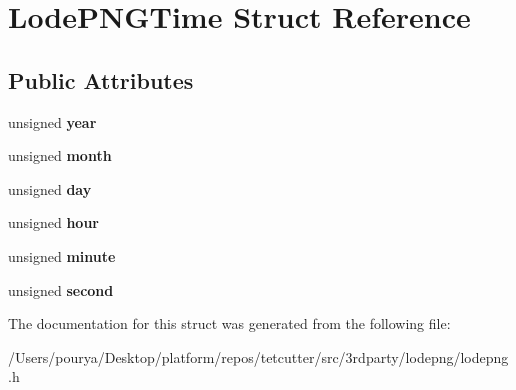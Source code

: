 \hypertarget{structLodePNGTime}{}\section{Lode\+P\+N\+G\+Time Struct Reference}
\label{structLodePNGTime}
\subsection*{Public Attributes}
\begin{DoxyCompactItemize}
\item 
\hypertarget{structLodePNGTime_a32b68342f39f3d38ba91a721b1149b8f}{}unsigned {\bfseries year}\label{structLodePNGTime_a32b68342f39f3d38ba91a721b1149b8f}

\item 
\hypertarget{structLodePNGTime_a295d890e862d5cd0c444e9d3a96fa9d5}{}unsigned {\bfseries month}\label{structLodePNGTime_a295d890e862d5cd0c444e9d3a96fa9d5}

\item 
\hypertarget{structLodePNGTime_aa3dee3b7b3a1e730fbded7a7b8cf355e}{}unsigned {\bfseries day}\label{structLodePNGTime_aa3dee3b7b3a1e730fbded7a7b8cf355e}

\item 
\hypertarget{structLodePNGTime_ac99cb7f3ce16a85f9f505b7f5f6e0aa7}{}unsigned {\bfseries hour}\label{structLodePNGTime_ac99cb7f3ce16a85f9f505b7f5f6e0aa7}

\item 
\hypertarget{structLodePNGTime_ac3045de79728f29fc61f534b062e0f13}{}unsigned {\bfseries minute}\label{structLodePNGTime_ac3045de79728f29fc61f534b062e0f13}

\item 
\hypertarget{structLodePNGTime_a6c691c5821e828488a8bb8a90751a2f0}{}unsigned {\bfseries second}\label{structLodePNGTime_a6c691c5821e828488a8bb8a90751a2f0}

\end{DoxyCompactItemize}


The documentation for this struct was generated from the following file\+:\begin{DoxyCompactItemize}
\item 
/\+Users/pourya/\+Desktop/platform/repos/tetcutter/src/3rdparty/lodepng/lodepng.\+h\end{DoxyCompactItemize}
